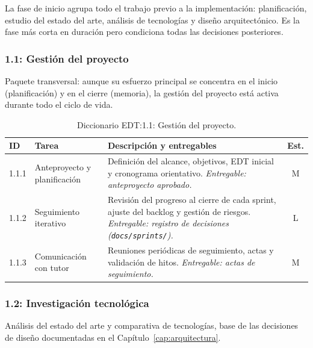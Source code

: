 La fase de inicio agrupa todo el trabajo previo a la implementación: planificación, estudio del estado del arte, análisis de tecnologías y diseño arquitectónico. Es la fase más corta en duración pero condiciona todas las decisiones posteriores.

\subsubsection{1.1: Gestión del proyecto}\label{subsubsec:gestion}

Paquete transversal: aunque su esfuerzo principal se concentra en el inicio (planificación) y en el cierre (memoria), la gestión del proyecto está activa durante todo el ciclo de vida.

\begin{table}[hbtp]
\centering
\small
\begin{tabular}{|l|l|p{7.5cm}|c|}
\hline
\textbf{ID} & \textbf{Tarea} & \textbf{Descripción y entregables} & \textbf{Est.} \\ \hline
1.1.1 & Anteproyecto y planificación & Definición del alcance, objetivos, EDT inicial y cronograma orientativo. \textit{Entregable: anteproyecto aprobado.} & M \\ \hline
1.1.2 & Seguimiento iterativo & Revisión del progreso al cierre de cada sprint, ajuste del backlog y gestión de riesgos. \textit{Entregable: registro de decisiones (\texttt{docs/sprints/}).} & L \\ \hline
1.1.3 & Comunicación con tutor & Reuniones periódicas de seguimiento, actas y validación de hitos. \textit{Entregable: actas de seguimiento.} & M \\ \hline
\end{tabular}
\caption{Diccionario EDT:1.1: Gestión del proyecto.}
\label{tab:dict-1-1}
\end{table}

\subsubsection{1.2: Investigación tecnológica}\label{subsubsec:investigacion}

Análisis del estado del arte y comparativa de tecnologías, base de las decisiones de diseño documentadas en el Capítulo~\ref{cap:arquitectura}.


